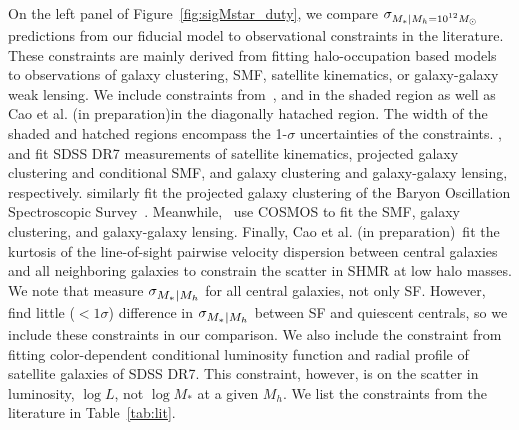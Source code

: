 \documentclass[12pt, letterpaper, preprint, tighten]{aastex62}
\newcommand{\edt}[1]{{\color{dred}{\bf} #1}}
\newcommand{\cao}{Cao et al. (in preparation)}
\newcommand{\siglogm}{\sigma_{\scaleto{M_*|M_h}{8pt}}}
\newcommand{\sigtwe}{\sigma_{\scaleto{M_*|M_h=10^{12}M_\odot}{8pt}}}
\begin{document}
On the left panel of Figure~\ref{fig:sigMstar_duty}, we compare $\sigtwe$
predictions from our fiducial model to observational constraints in the 
literature. These constraints are mainly derived from fitting halo-occupation 
based models to observations of galaxy clustering, SMF, satellite kinematics, 
or galaxy-galaxy weak lensing. We include constraints 
from~\cite{leauthaud2012, reddick2013, zu2015, tinker2017}, and \cite{lange2018a}
in the shaded region as well as \cao in the diagonally hatached region. 
\edt{
    The width of the shaded and hatched regions encompass the 1-$\sigma$ 
    uncertainties of the constraints.
}
\cite{reddick2013}, and \cite{zu2015} fit SDSS DR7 measurements of satellite 
kinematics, projected galaxy clustering and conditional SMF, and galaxy 
clustering and galaxy-galaxy lensing, respectively. \cite{tinker2017} 
similarly fit the projected galaxy clustering of the Baryon Oscillation 
Spectroscopic Survey~\citep{dawson2013}. Meanwhile,~\cite{leauthaud2012}
use COSMOS to fit the SMF, galaxy clustering, and galaxy-galaxy lensing.
Finally, \cao~fit the kurtosis of the line-of-sight pairwise velocity 
dispersion between central galaxies and all neighboring galaxies to constrain 
the scatter in SHMR at low halo masses. We note that
\cite{leauthaud2012, reddick2013, zu2015, tinker2017} measure $\siglogm$ for all central 
galaxies, not only SF. However, \cite{tinker2013} find little ($< 1\sigma$) difference 
in $\siglogm$ between SF and quiescent centrals, so we include these constraints 
in our comparison. We also include the \cite{lange2018a} constraint from fitting 
color-dependent conditional luminosity function and radial profile of satellite 
galaxies of SDSS DR7. This constraint, however, is on the scatter in luminosity, 
$\log L$, not $\log M_*$ at a given $M_h$. We list the constraints from the 
literature in Table~\ref{tab:lit}. 
\end{document}
